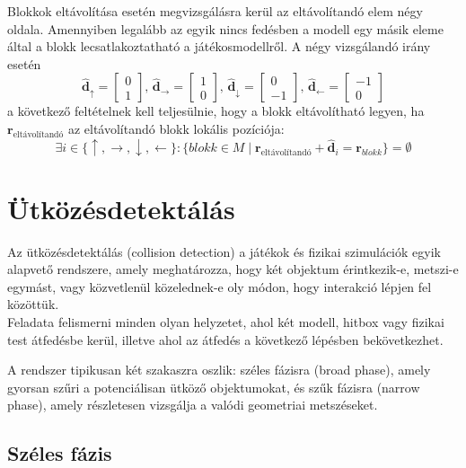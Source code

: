\documentclass[12pt]{report}
\begin{document}
Blokkok eltávolítása esetén megvizsgálásra kerül az eltávolítandó elem négy oldala. Amennyiben legalább az egyik nincs fedésben a modell egy másik eleme által a blokk lecsatlakoztatható a játékosmodellről. A négy vizsgálandó irány esetén
\[
    \hat{\mathbf{d}}_{\uparrow} =
    \begin{bmatrix}
        0 \\
        1
    \end{bmatrix}
    \text{, }
    \hat{\mathbf{d}}_{\rightarrow} =
    \begin{bmatrix}
        1 \\
        0
    \end{bmatrix}
    \text{, }
    \hat{\mathbf{d}}_{\downarrow} =
    \begin{bmatrix}
        0 \\
        -1
    \end{bmatrix}
    \text{, }
    \hat{\mathbf{d}}_{\leftarrow} =
    \begin{bmatrix}
        -1 \\
        0
    \end{bmatrix}
\]
a következő feltételnek kell teljesülnie, hogy a blokk eltávolítható legyen, ha $\mathbf{r}_{\text{eltávolítandó}}$ az eltávolítandó blokk lokális pozíciója:
\[
    \exists i \in \{\uparrow, \rightarrow, \downarrow, \leftarrow\} \colon \{blokk \in M \mid \mathbf{r}_{\text{eltávolítandó}} + \hat{\mathbf{d}}_{i} = \mathbf{r}_{blokk} \} = \emptyset
\]

\newpage
\section{Ütközésdetektálás}

Az ütközésdetektálás (collision detection) a játékok és fizikai szimulációk egyik alapvető rendszere, amely meghatározza, hogy két objektum érintkezik-e, metszi-e egymást, vagy közvetlenül közelednek-e oly módon, hogy interakció lépjen fel közöttük.\\
Feladata felismerni minden olyan helyzetet, ahol két modell, hitbox vagy fizikai test átfedésbe kerül, illetve ahol az átfedés a következő lépésben bekövetkezhet.

A rendszer tipikusan két szakaszra oszlik: széles fázisra (broad phase), amely gyorsan szűri a potenciálisan ütköző objektumokat, és szűk fázisra (narrow phase), amely részletesen vizsgálja a valódi geometriai metszéseket.

\subsection{Széles fázis}
\end{document}
